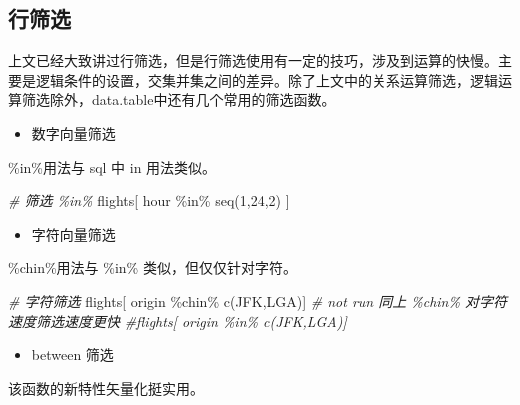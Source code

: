 \documentclass[
]{book}
\newenvironment{Shaded}{\begin{snugshade}}{\end{snugshade}}
\newcommand{\CommentTok}[1]{\textcolor[rgb]{0.56,0.35,0.01}{\textit{#1}}}
\newcommand{\DecValTok}[1]{\textcolor[rgb]{0.00,0.00,0.81}{#1}}
\newcommand{\FunctionTok}[1]{\textcolor[rgb]{0.00,0.00,0.00}{#1}}
\newcommand{\NormalTok}[1]{#1}
\newcommand{\SpecialCharTok}[1]{\textcolor[rgb]{0.00,0.00,0.00}{#1}}
\newcommand{\StringTok}[1]{\textcolor[rgb]{0.31,0.60,0.02}{#1}}
\providecommand{\tightlist}{%
  \setlength{\itemsep}{0pt}\setlength{\parskip}{0pt}}
\begin{document}
\hypertarget{ux884cux7b5bux9009}{%
\subsection{行筛选}\label{ux884cux7b5bux9009}}

上文已经大致讲过行筛选，但是行筛选使用有一定的技巧，涉及到运算的快慢。主要是逻辑条件的设置，交集并集之间的差异。除了上文中的关系运算筛选，逻辑运算筛选除外，data.table中还有几个常用的筛选函数。

\begin{itemize}
\tightlist
\item
  数字向量筛选
\end{itemize}

\%in\%用法与 sql 中 in 用法类似。

\begin{Shaded}
\begin{Highlighting}[]
\CommentTok{\# 筛选 \%in\% }
\NormalTok{flights[ hour }\SpecialCharTok{\%in\%} \FunctionTok{seq}\NormalTok{(}\DecValTok{1}\NormalTok{,}\DecValTok{24}\NormalTok{,}\DecValTok{2}\NormalTok{) ]}
\end{Highlighting}
\end{Shaded}

\begin{itemize}
\tightlist
\item
  字符向量筛选
\end{itemize}

\%chin\%用法与 \%in\% 类似，但仅仅针对字符。

\begin{Shaded}
\begin{Highlighting}[]
\CommentTok{\# 字符筛选}
\NormalTok{flights[ origin }\SpecialCharTok{\%chin\%} \FunctionTok{c}\NormalTok{(}\StringTok{\textquotesingle{}JFK\textquotesingle{}}\NormalTok{,}\StringTok{\textquotesingle{}LGA\textquotesingle{}}\NormalTok{)]}
\CommentTok{\# not run 同上 \%chin\% 对字符速度筛选速度更快}
\CommentTok{\#flights[ origin \%in\% c(\textquotesingle{}JFK\textquotesingle{},\textquotesingle{}LGA\textquotesingle{})]}
\end{Highlighting}
\end{Shaded}

\begin{itemize}
\tightlist
\item
  between 筛选
\end{itemize}

该函数的新特性矢量化挺实用。
\end{document}

